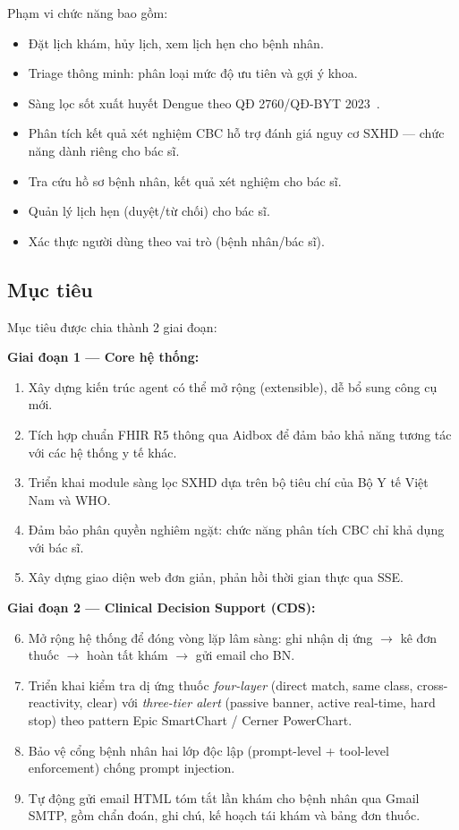 \documentclass[a4paper,13pt,3p,oneside]{report}
\theoremstyle{definition}
\theoremstyle{remark}
\theoremstyle{definition}
\begin{document}
Phạm vi chức năng bao gồm:
\begin{itemize}
  \item Đặt lịch khám, hủy lịch, xem lịch hẹn cho bệnh nhân.
  \item Triage thông minh: phân loại mức độ ưu tiên và gợi ý khoa.
  \item Sàng lọc sốt xuất huyết Dengue theo QĐ 2760/QĐ-BYT 2023~\cite{qd2760}.
  \item Phân tích kết quả xét nghiệm CBC hỗ trợ đánh giá nguy cơ SXHD --- chức năng dành riêng cho bác sĩ.
  \item Tra cứu hồ sơ bệnh nhân, kết quả xét nghiệm cho bác sĩ.
  \item Quản lý lịch hẹn (duyệt/từ chối) cho bác sĩ.
  \item Xác thực người dùng theo vai trò (bệnh nhân/bác sĩ).
\end{itemize}

\subsection{Mục tiêu}

Mục tiêu được chia thành 2 giai đoạn:

\textbf{Giai đoạn 1 --- Core hệ thống:}
\begin{enumerate}
  \item Xây dựng kiến trúc agent có thể mở rộng (extensible), dễ bổ sung công cụ mới.
  \item Tích hợp chuẩn FHIR R5 thông qua Aidbox để đảm bảo khả năng tương tác với các hệ thống y tế khác.
  \item Triển khai module sàng lọc SXHD dựa trên bộ tiêu chí của Bộ Y tế Việt Nam và WHO.
  \item Đảm bảo phân quyền nghiêm ngặt: chức năng phân tích CBC chỉ khả dụng với bác sĩ.
  \item Xây dựng giao diện web đơn giản, phản hồi thời gian thực qua SSE.
\end{enumerate}

\textbf{Giai đoạn 2 --- Clinical Decision Support (CDS):}
\begin{enumerate}\setcounter{enumi}{5}
  \item Mở rộng hệ thống để đóng vòng lặp lâm sàng: ghi nhận dị ứng $\to$ kê đơn thuốc $\to$ hoàn tất khám $\to$ gửi email cho BN.
  \item Triển khai kiểm tra dị ứng thuốc \textit{four-layer} (direct match, same class, cross-reactivity, clear) với \textit{three-tier alert} (passive banner, active real-time, hard stop) theo pattern Epic SmartChart / Cerner PowerChart.
  \item Bảo vệ cổng bệnh nhân hai lớp độc lập (prompt-level + tool-level enforcement) chống prompt injection.
  \item Tự động gửi email HTML tóm tắt lần khám cho bệnh nhân qua Gmail SMTP, gồm chẩn đoán, ghi chú, kế hoạch tái khám và bảng đơn thuốc.
\end{enumerate}
\end{document}
